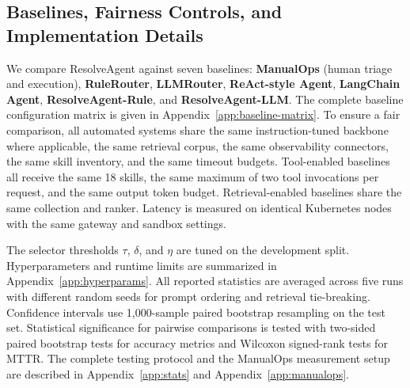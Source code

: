 \documentclass[conference]{IEEEtran}
\begin{document}
\begin{table}[t]
\centering
\caption{Datasets and annotation summary.}
\label{tab:datasets}
\end{table}

\subsection{Baselines, Fairness Controls, and Implementation Details}
We compare ResolveAgent against seven baselines: \textbf{ManualOps} (human triage and execution), \textbf{RuleRouter}, \textbf{LLMRouter}, \textbf{ReAct-style Agent}, \textbf{LangChain Agent}, \textbf{ResolveAgent-Rule}, and \textbf{ResolveAgent-LLM}. The complete baseline configuration matrix is given in Appendix~\ref{app:baseline-matrix}. To ensure a fair comparison, all automated systems share the same instruction-tuned backbone where applicable, the same retrieval corpus, the same observability connectors, the same skill inventory, and the same timeout budgets. Tool-enabled baselines all receive the same 18 skills, the same maximum of two tool invocations per request, and the same output token budget. Retrieval-enabled baselines share the same collection and ranker. Latency is measured on identical Kubernetes nodes with the same gateway and sandbox settings.

The selector thresholds $\tau$, $\delta$, and $\eta$ are tuned on the development split. Hyperparameters and runtime limits are summarized in Appendix~\ref{app:hyperparams}. All reported statistics are averaged across five runs with different random seeds for prompt ordering and retrieval tie-breaking. Confidence intervals use 1{,}000-sample paired bootstrap resampling on the test set. Statistical significance for pairwise comparisons is tested with two-sided paired bootstrap tests for accuracy metrics and Wilcoxon signed-rank tests for MTTR. The complete testing protocol and the ManualOps measurement setup are described in Appendix~\ref{app:stats} and Appendix~\ref{app:manualops}.
\end{document}
